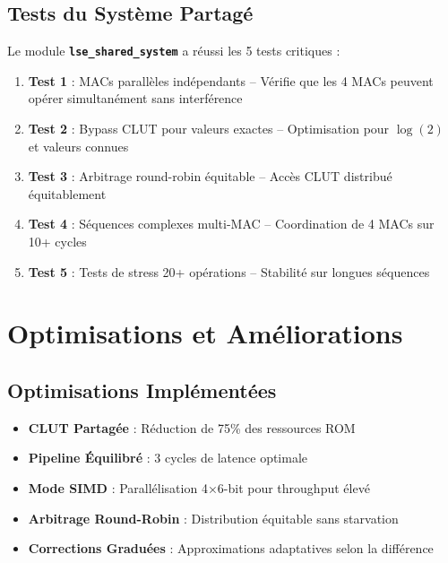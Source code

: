 \documentclass[12pt,a4paper]{article}
\newcommand{\module}[1]{\textbf{\texttt{#1}}}
\begin{document}
\subsection{Tests du Système Partagé}

Le module \module{lse\_shared\_system} a réussi les 5 tests critiques :

\begin{enumerate}
    \item \textbf{Test 1} : MACs parallèles indépendants -- Vérifie que les 4 MACs peuvent opérer simultanément sans interférence
    \item \textbf{Test 2} : Bypass CLUT pour valeurs exactes -- Optimisation pour $\log(2)$ et valeurs connues
    \item \textbf{Test 3} : Arbitrage round-robin équitable -- Accès CLUT distribué équitablement
    \item \textbf{Test 4} : Séquences complexes multi-MAC -- Coordination de 4 MACs sur 10+ cycles
    \item \textbf{Test 5} : Tests de stress 20+ opérations -- Stabilité sur longues séquences
\end{enumerate}

\section{Optimisations et Améliorations}

\subsection{Optimisations Implémentées}

\begin{itemize}
    \item \textbf{CLUT Partagée} : Réduction de 75\% des ressources ROM
    \item \textbf{Pipeline Équilibré} : 3 cycles de latence optimale
    \item \textbf{Mode SIMD} : Parallélisation 4×6-bit pour throughput élevé
    \item \textbf{Arbitrage Round-Robin} : Distribution équitable sans starvation
    \item \textbf{Corrections Graduées} : Approximations adaptatives selon la différence
\end{itemize}
\end{document}
